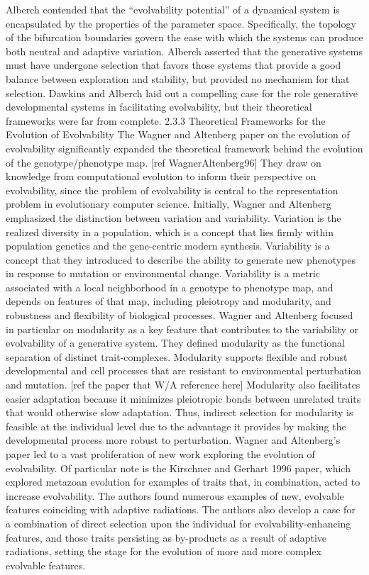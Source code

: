 Alberch contended that the “evolvability potential” of a dynamical system is encapsulated by the properties of the parameter space. Specifically, the topology of the bifurcation boundaries govern the ease with which the systems can produce both neutral and adaptive variation. Alberch asserted that the generative systems must have undergone selection that favors those systems that provide a good balance between exploration and stability, but provided no mechanism for that selection.
Dawkins and Alberch laid out a compelling case for the role generative developmental systems in facilitating evolvability, but their theoretical frameworks were far from complete.
2.3.3 Theoretical Frameworks for the Evolution of Evolvability
The Wagner and Altenberg paper on the evolution of evolvability significantly expanded the theoretical framework behind the evolution of the genotype/phenotype map. [ref WagnerAltenberg96] They draw on knowledge from computational evolution to inform their perspective on evolvability, since the problem of evolvability is central to the representation problem in evolutionary computer science. 
Initially, Wagner and Altenberg emphasized the distinction between variation and variability. Variation is the realized diversity in a population, which is a concept that lies firmly within population genetics and the gene-centric modern synthesis.  Variability is a concept that they introduced to describe the ability to generate new phenotypes in response to mutation or environmental change. Variability is a metric associated with a local neighborhood in a genotype to phenotype map, and depends on features of that map, including pleiotropy and modularity, and robustness and flexibility of biological processes.
Wagner and Altenberg focused in particular on modularity as a key feature that contributes to the variability or evolvability of a generative system. They defined modularity as the functional separation of distinct trait-complexes. Modularity supports flexible and robust developmental and cell processes that are resistant to environmental perturbation and mutation. [ref the paper that W/A reference here] Modularity also facilitates easier adaptation because it minimizes pleiotropic bonds between unrelated traits that would otherwise slow adaptation. Thus, indirect selection for modularity is feasible at the individual level due to the advantage it provides by making the developmental process more robust to perturbation.
Wagner and Altenberg’s paper led to a vast proliferation of new work exploring the evolution of evolvability. Of particular note is the Kirschner and Gerhart 1996 paper, which explored metazoan evolution for examples of traits that, in combination, acted to increase evolvability. The authors found numerous examples of new, evolvable features coinciding with adaptive radiations. The authors also develop a case for a combination of direct selection upon the individual for evolvability-enhancing features, and those traits persisting as by-products as a result of adaptive radiations, setting the stage for the evolution of more and more complex evolvable features.
